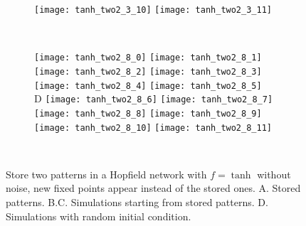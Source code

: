 \begin{figure}[H]
\begin{subfigure}{\textwidth}
      \texttt{[image: tanh\_two2\_3\_10]}
      \texttt{[image: tanh\_two2\_3\_11]}
    \end{subfigure}\\[0.6em]
    \begin{subfigure}{\textwidth}
      \hspace{2em}
      \texttt{[image: tanh\_two2\_8\_0]}
      \texttt{[image: tanh\_two2\_8\_1]}
      \texttt{[image: tanh\_two2\_8\_2]}
      \texttt{[image: tanh\_two2\_8\_3]}
      \texttt{[image: tanh\_two2\_8\_4]}
      \texttt{[image: tanh\_two2\_8\_5]}\\
      \hspace*{1em}
      \textsf{D}
      \texttt{[image: tanh\_two2\_8\_6]}
      \texttt{[image: tanh\_two2\_8\_7]}
      \texttt{[image: tanh\_two2\_8\_8]}
      \texttt{[image: tanh\_two2\_8\_9]}
      \texttt{[image: tanh\_two2\_8\_10]}
      \texttt{[image: tanh\_two2\_8\_11]}
    \end{subfigure}\\[0.6em]
  \vspace{1.2em}
  \caption{Store two patterns in a Hopfield network with $f = \tanh$ 
           without noise, new fixed points appear instead of the stored ones.
           \textsf{A.} Stored patterns.
           \textsf{B.C.} Simulations starting from stored patterns.
           \textsf{D.} Simulations with random initial condition.}
  \label{fig: Hopfield_tanh_two2}

\end{figure}

\vfill
\fi

